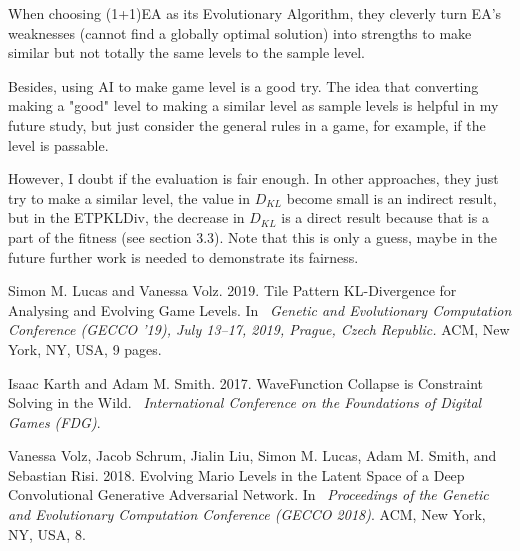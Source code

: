 \documentclass[runningheads]{llncs}
\begin{document}
When choosing (1+1)EA as its Evolutionary Algorithm, they cleverly turn EA's weaknesses (cannot find a globally optimal solution) into strengths to make similar but not totally the same levels to the sample level.

Besides, using AI to make game level is a good try. The idea that converting making a "good" level to making a similar level as sample levels is helpful in my future study, but just consider the general rules in a game, for example, if the level is passable.

However, I doubt if the evaluation is fair enough. In other approaches, they just try to make a similar level, the value in \(D_{KL}\) become small is an indirect result, but in the ETPKLDiv, the decrease in \(D_{KL}\) is a direct result because that is a part of the fitness (see section 3.3). Note that this is only a guess, maybe in the future further work is needed to demonstrate its fairness.





\begin{thebibliography}{3}
Simon M. Lucas and Vanessa Volz. 2019. Tile Pattern KL-Divergence for Analysing and Evolving Game Levels. In ~\textit{Genetic and Evolutionary Computation Conference (GECCO ’19), July 13–17, 2019, Prague, Czech Republic.}  ACM, New York, NY, USA, 9 pages.
 

 
Isaac Karth and Adam M. Smith. 2017. WaveFunction Collapse is Constraint Solving in the Wild.  ~\textit{International Conference on the Foundations of Digital Games (FDG)}.

Vanessa Volz, Jacob Schrum, Jialin Liu, Simon M. Lucas, Adam M. Smith, and Sebastian Risi. 2018. Evolving Mario Levels in the Latent Space of a Deep Convolutional Generative Adversarial Network. In ~\textit{Proceedings of the Genetic and Evolutionary Computation Conference (GECCO 2018)}. ACM, New York, NY, USA, 8.  





\end{thebibliography}
\end{document}
